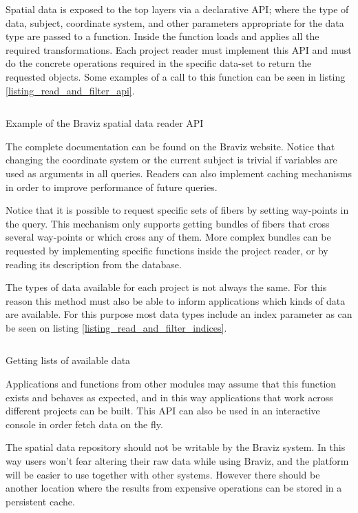 Spatial data is exposed to the top layers via a declarative API; where the type of data, subject, coordinate system, and other parameters appropriate for the data type are passed to a function. Inside the function loads and applies all the required transformations. Each project reader must implement this API and must do the concrete operations required in the specific data-set to return the requested objects. Some examples of a call to this function can be seen in listing \ref{listing_read_and_filter_api}.

\begin{listing}
\inputminted{python}{code/read_and_filter_1.py}
\caption{Example of the Braviz spatial data reader API}
\label{listing_read_and_filter_api}
\end{listing}

The complete documentation can be found on the Braviz website. Notice that changing the coordinate system or the current subject is trivial if variables are used as arguments in all queries. Readers can also implement caching mechanisms in order to improve performance of future queries.  

Notice that it is possible to request specific sets of fibers by setting way-points in the query. This mechanism only supports getting bundles of fibers that cross several way-points or which cross any of them. More complex bundles can be requested by implementing specific functions inside the project reader, or by reading its description from the database. 

The types of data available for each project is not always the same. For this reason this method must also be able to inform applications which kinds of data are available. For this purpose most data types include an index parameter as can be seen on listing \ref{listing_read_and_filter_indices}.

\begin{listing}
\inputminted{python}{code/read_and_filter_indices.py}
\caption{Getting lists of available data}
\label{listing_read_and_filter_indices}
\end{listing}

Applications and functions from other modules may assume that this function exists and behaves as expected, and in this way applications that work across different projects can be built. This API can also be used in an interactive console in order fetch data on the fly. 

The spatial data repository should not be writable by the Braviz system. In this way users won't fear altering their raw data while using Braviz, and the platform will be easier to use together with other systems. However there should be another location where the results from expensive operations can be stored in a persistent cache. 


